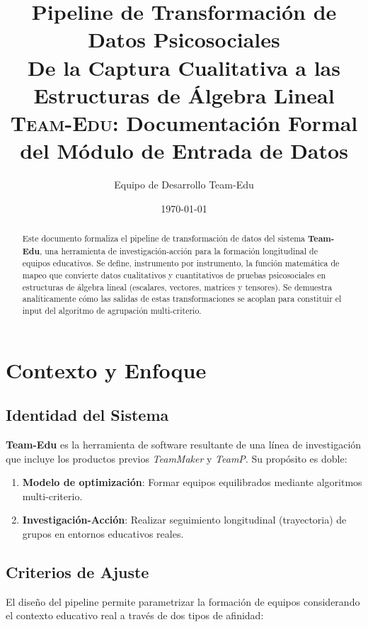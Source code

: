 \documentclass[12pt,a4paper]{article}
\title{\textbf{Pipeline de Transformación de Datos Psicosociales}\\\large De la Captura Cualitativa a las Estructuras de Álgebra Lineal\\\vspace{0.3cm}\large \textsc{Team-Edu}: Documentación Formal del Módulo de Entrada de Datos}
\author{Equipo de Desarrollo Team-Edu}
\date{\today}
\begin{document}
\maketitle

\begin{abstract}
Este documento formaliza el pipeline de transformación de datos del sistema \textbf{Team-Edu}, una herramienta de investigación-acción para la formación longitudinal de equipos educativos. Se define, instrumento por instrumento, la función matemática de mapeo que convierte datos cualitativos y cuantitativos de pruebas psicosociales en estructuras de álgebra lineal (escalares, vectores, matrices y tensores). Se demuestra analíticamente cómo las salidas de estas transformaciones se acoplan para constituir el input del algoritmo de agrupación multi-criterio.
\end{abstract}

\tableofcontents
\newpage

\section{Contexto y Enfoque}

\subsection{Identidad del Sistema}

\textbf{Team-Edu} es la herramienta de software resultante de una línea de investigación que incluye los productos previos \emph{TeamMaker} y \emph{TeamP}. Su propósito es doble:

\begin{enumerate}
    \item \textbf{Modelo de optimización}: Formar equipos equilibrados mediante algoritmos multi-criterio.
    \item \textbf{Investigación-Acción}: Realizar seguimiento longitudinal (trayectoria) de grupos en entornos educativos reales.
\end{enumerate}

\subsection{Criterios de Ajuste}

El diseño del pipeline permite parametrizar la formación de equipos considerando el contexto educativo real a través de dos tipos de afinidad:
\end{document}

